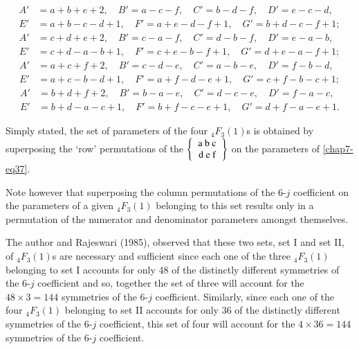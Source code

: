 {\fontsize{9.4pt}{11pt}\selectfont
\begin{equation}
\begin{split}
A' & = a+b+e+2, \quad B'=a-c-f, \quad C'=b-d-f, \quad D'=e-c-d,\\
E' & = a+b-c-d+1, \quad F'=a+e-d-f+1, \quad G'=b+d-c-f+1;\label{chap7-eq38}
\end{split}
\end{equation}
\begin{equation}
\begin{split}
A' & = c+d+e+2, \quad B'=c-a-f, \quad C'=d-b-f, \quad D'=e-a-b,\\
E' & = c+d-a-b+1, \quad F'=c+e-b-f+1, \quad G'=d+e-a-f+1;\label{chap7-eq39}
\end{split}
\end{equation}
\begin{equation}
\begin{split}
A' & = a+c+f+2, \quad B'=c-d-e, \quad C'=a-b-e, \quad D'=f-b-d,\\
E' & = a+c-b-d+1, \quad F'=a+f-d-e+1, \quad G'=c+f-b-c+1; \label{chap7-eq40}
\end{split}
\end{equation}
\begin{equation}
\begin{split}
A' & = b+d+f+2, \quad B'=b-a-e, \quad C'=d-c-e, \quad D'=f-a-c,\\
E' & = b+d-a-c+1, \quad F'=b+f-c-e+1, \quad G'=d+f-a-e+1. \label{chap7-eq41}
\end{split}
\end{equation}}\relax

Simply stated, the set of parameters of the four $_4F_3(1)$s is obtained by superposing the `row' permutations of the $\left\{ \begin{tabular} {c} a\ b\ c\\ d\ e\ f \\ \end{tabular} \right\}$ on the parameters of \eqref{chap7-eq37}.

Note however that superposing the column permutations of the 6-$j$ coefficient on the parameters of a given $_4F_3(1)$ belonging to this set results only in a permutation of the numerator and denominator parameters amongst themselves.

The author and Rajeswari (1985), observed that these two sets, set I and set II, of $_4F_3(1)$s are necessary and sufficient since each one of the three $_4F_3(1)$ belonging to set I accounts for only 48 of the distinctly different symmetries of the 6-$j$ coefficient and so, together the set of three will account for the $48\times 3 = 144$ symmetries of the 6-$j$ coefficient. Similarly, since each one of the four $_4F_3(1)$ belonging to set II accounts for only 36 of the distinctly different symmetries of the 6-$j$ coefficient, this set of four will account for the $4\times 36 = 144$ symmetries of the 6-$j$ coefficient.

